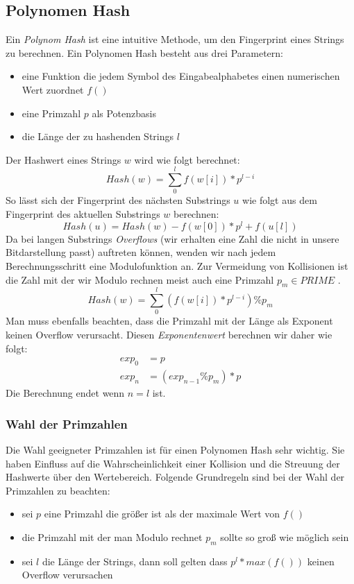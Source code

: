 \subsection{Polynomen Hash}

Ein \textit{Polynom Hash} ist eine intuitive Methode, um den Fingerprint eines Strings zu berechnen. 
Ein Polynomen Hash besteht aus drei Parametern:
\begin{itemize}
	\item eine Funktion die jedem Symbol des Eingabealphabetes einen numerischen Wert zuordnet $f()$
	\item  eine Primzahl $p$ als Potenzbasis 
	\item die Länge der zu hashenden Strings $l$
\end{itemize} 
Der Hashwert eines Strings $w$ wird wie folgt berechnet:
\begin{equation}\nonumber
Hash(w)=\sum_{0}^{l}f(w[i])*p^{l-i}
\end{equation}
\noindent
So lässt sich der Fingerprint des nächsten Substrings $u$ wie folgt aus dem Fingerprint des aktuellen Substrings $w$ berechnen:
\begin{equation}\nonumber
	Hash(u)=Hash(w)-f(w[0])*p^{l}+f(u[l])
\end{equation}
Da bei langen Substrings \textit{Overflows} (wir erhalten eine Zahl die nicht in unsere Bitdarstellung passt) auftreten können, wenden wir nach jedem Berechnungsschritt eine Modulofunktion an. Zur Vermeidung von Kollisionen ist die Zahl mit der wir Modulo rechnen meist auch eine Primzahl $p_m \in PRIME$ \cite{joyhash}\cite{Karp1987}.
\begin{equation}\nonumber
	Hash(w)=\sum_{0}^{l}(f(w[i])*p^{l-i})\%p_m	
\end{equation}
Man muss ebenfalls beachten, dass die Primzahl mit der Länge als Exponent keinen Overflow verursacht.  Diesen \textit{Exponentenwert} berechnen wir daher wie folgt:
\begin{align}\nonumber
	exp_0&=p\\ \nonumber
	exp_n&= (exp_{n-1} \% p_m ) * p
\end{align}
Die Berechnung endet wenn $n=l$ ist.

\subsubsection{Wahl der Primzahlen}

Die Wahl geeigneter Primzahlen ist für einen Polynomen Hash sehr wichtig. Sie haben Einfluss auf die Wahrscheinlichkeit einer Kollision und die Streuung der Hashwerte über den Wertebereich. Folgende Grundregeln sind bei der Wahl der Primzahlen zu beachten:
\begin{itemize}
	\item  sei $p$ eine Primzahl die größer ist als  der maximale Wert von $f()$
	\item die Primzahl mit der man Modulo rechnet $p_m$ sollte so groß wie möglich sein
	\item  sei $l$ die Länge der Strings, dann soll gelten dass $p^l *max(f())$ keinen Overflow verursachen
\end{itemize}
\cite{joyhash}\cite{LZ77Approx}

